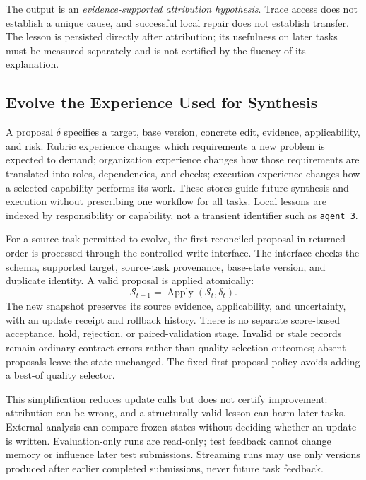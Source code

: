 \documentclass[11pt]{article}
\newcommand{\state}{\mathcal{S}}
\begin{document}
The output is an \emph{evidence-supported attribution hypothesis}. Trace access does not establish a unique cause, and successful local repair does not establish transfer. The lesson is persisted directly after attribution; its usefulness on later tasks must be measured separately and is not certified by the fluency of its explanation.

\subsection{Evolve the Experience Used for Synthesis}
\label{sec:update}

A proposal $\delta$ specifies a target, base version, concrete edit, evidence, applicability, and risk. Rubric experience changes which requirements a new problem is expected to demand; organization experience changes how those requirements are translated into roles, dependencies, and checks; execution experience changes how a selected capability performs its work. These stores guide future synthesis and execution without prescribing one workflow for all tasks. Local lessons are indexed by responsibility or capability, not a transient identifier such as \texttt{agent\_3}.

For a source task permitted to evolve, the first reconciled proposal in returned order is processed through the controlled write interface. The interface checks the schema, supported target, source-task provenance, base-state version, and duplicate identity. A valid proposal is applied atomically:
\begin{equation}
\state_{t+1}=\operatorname{Apply}(\state_t,\delta_t).
\label{eq:update}
\end{equation}
The new snapshot preserves its source evidence, applicability, and uncertainty, with an update receipt and rollback history. There is no separate score-based acceptance, hold, rejection, or paired-validation stage. Invalid or stale records remain ordinary contract errors rather than quality-selection outcomes; absent proposals leave the state unchanged. The fixed first-proposal policy avoids adding a best-of quality selector.

This simplification reduces update calls but does not certify improvement: attribution can be wrong, and a structurally valid lesson can harm later tasks. External analysis can compare frozen states without deciding whether an update is written. Evaluation-only runs are read-only; test feedback cannot change memory or influence later test submissions. Streaming runs may use only versions produced after earlier completed submissions, never future task feedback.
\end{document}
